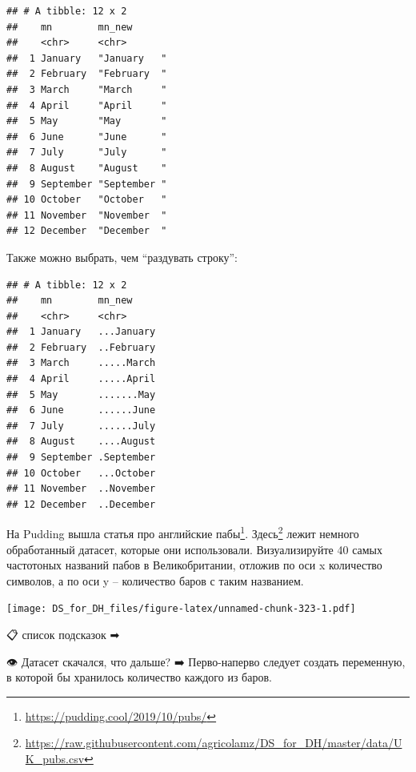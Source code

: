 \documentclass[
]{book}
\makeatletter
\newenvironment{Shaded}{\begin{snugshade}}{\end{snugshade}}
\newcommand{\DataTypeTok}[1]{\textcolor[rgb]{0.13,0.29,0.53}{#1}}
\newcommand{\DecValTok}[1]{\textcolor[rgb]{0.00,0.00,0.81}{#1}}
\newcommand{\KeywordTok}[1]{\textcolor[rgb]{0.13,0.29,0.53}{\textbf{#1}}}
\newcommand{\NormalTok}[1]{#1}
\newcommand{\OperatorTok}[1]{\textcolor[rgb]{0.81,0.36,0.00}{\textbf{#1}}}
\newcommand{\StringTok}[1]{\textcolor[rgb]{0.31,0.60,0.02}{#1}}
\renewcommand{\href}[2]{#2\footnote{\url{#1}}}
\newenvironment{kframe}{%
    \medskip{}
    \setlength{\fboxsep}{.8em}
    \def\at@end@of@kframe{}%
    \ifinner\ifhmode%
    \def\at@end@of@kframe{\end{minipage}}%
    \begin{minipage}{\columnwidth}%
    \fi\fi%
    \def\FrameCommand##1{\hskip\@totalleftmargin \hskip-\fboxsep
    \colorbox{shadecolor}{##1}\hskip-\fboxsep
        \hskip-\linewidth \hskip-\@totalleftmargin \hskip\columnwidth}%
    \MakeFramed {\advance\hsize-\width
      \@totalleftmargin\z@ \linewidth\hsize
      \@setminipage}}%
  {\par\unskip\endMakeFramed%
    \at@end@of@kframe}
\newenvironment{rmdblock}[1]
  {
    \begin{itemize}
    \renewcommand{\labelitemi}{
      \raisebox{-.7\height}[0pt][0pt]{
        {\setkeys{Gin}{width=3em,keepaspectratio}\texttt{[image: images/\#1]}}
        }
        }
        \setlength{\fboxsep}{1em}
        \begin{kframe}
        \item
      }
      {
        \end{kframe}
        \end{itemize}
      }
\newenvironment{rmdtask}
      {\begin{rmdblock}{task}}
      {\end{rmdblock}}
\makeatother
\begin{document}
\begin{verbatim}
## # A tibble: 12 x 2
##    mn        mn_new      
##    <chr>     <chr>       
##  1 January   "January   "
##  2 February  "February  "
##  3 March     "March     "
##  4 April     "April     "
##  5 May       "May       "
##  6 June      "June      "
##  7 July      "July      "
##  8 August    "August    "
##  9 September "September "
## 10 October   "October   "
## 11 November  "November  "
## 12 December  "December  "
\end{verbatim}

Также можно выбрать, чем ``раздувать строку'':

\begin{Shaded}
\end{Shaded}

\begin{verbatim}
## # A tibble: 12 x 2
##    mn        mn_new    
##    <chr>     <chr>     
##  1 January   ...January
##  2 February  ..February
##  3 March     .....March
##  4 April     .....April
##  5 May       .......May
##  6 June      ......June
##  7 July      ......July
##  8 August    ....August
##  9 September .September
## 10 October   ...October
## 11 November  ..November
## 12 December  ..December
\end{verbatim}

\begin{rmdtask}
На Pudding вышла \href{https://pudding.cool/2019/10/pubs/}{статья про
английские пабы}.
\href{https://raw.githubusercontent.com/agricolamz/DS_for_DH/master/data/UK_pubs.csv}{Здесь}
лежит немного обработанный датасет, которые они использовали.
Визуализируйте 40 самых частотоных названий пабов в Великобритании,
отложив по оси x количество символов, а по оси y -- количество баров с
таким названием.
\end{rmdtask}

\texttt{[image: DS\_for\_DH\_files/figure-latex/unnamed-chunk-323-1.pdf]}

📋 список подсказок ➡

👁 Датасет скачался, что дальше? ➡
Перво-наперво следует создать переменную, в которой бы хранилось количество каждого из баров.
\end{document}
